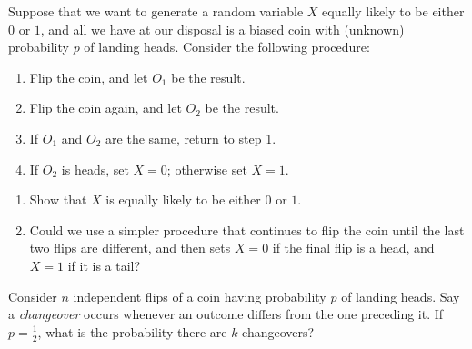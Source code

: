 \begin{exercise}
\label{ex:random-variables-28}
Suppose that we want to generate a random variable $X$ equally likely to be either $0$ or $1$, and all we have at our disposal is a biased coin with (unknown) probability $p$ of landing heads. Consider the following procedure:
\begin{enumerate}
    \item Flip the coin, and let $O_1$ be the result.
    \item Flip the coin again, and let $O_2$ be the result.
    \item If $O_1$ and $O_2$ are the same, return to step 1.
    \item If $O_2$ is heads, set $X = 0$; otherwise set $X = 1$.
\end{enumerate}
\begin{enumerate}
    \item [(a)] Show that $X$ is equally likely to be either $0$ or $1$.
    \item [(b)] Could we use a simpler procedure that continues to flip the coin until the last two flips are different, and then sets $X=0$ if the final flip is a head, and $X=1$ if it is a tail?
\end{enumerate}
\end{exercise}


\begin{exercise}
\label{ex:random-variables-29}
Consider $n$ independent flips of a coin having probability $p$ of landing heads. Say a \emph{changeover} occurs whenever an outcome differs from the one preceding it. If $p = \frac{1}{2}$, what is the probability there are $k$ changeovers?
\end{exercise}

